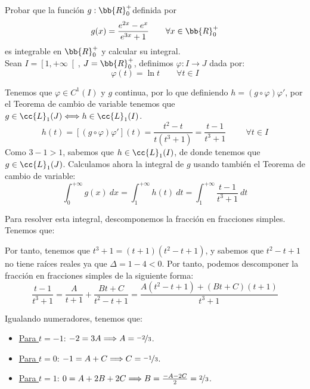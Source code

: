 \begin{ejercicio} Probar que la función $g:\bb{R}_0^+$definida por
    \begin{equation*}
        g(x) = \frac{e^{2x}-e^x}{e^{3x}+1}
        \qquad \forall x\in \bb{R}_0^+
    \end{equation*}
    es integrable en $\bb{R}_0^+$ y calcular su integral.\\

    Sean $I=\left[1,+\infty\right[$, $J=\bb{R}^+_0$, definimos $\varphi:I\longrightarrow J$ dada por:
    \begin{equation*}
        \varphi(t) = \ln t \qquad \forall t\in I
    \end{equation*}
    
    Tenemos que $\varphi \in C^1(I)$ y $g$ continua, por lo que definiendo $h=(g\circ \varphi)\varphi'$, por el Teorema de cambio de variable tenemos que $g\in \cc{L}_1(J)\Longleftrightarrow h\in \cc{L}_1(I)$.
    \begin{equation*}
        h(t) = [(g\circ \varphi)\varphi'](t) = \dfrac{t^2-t}{t(t^3+1)} = \dfrac{t-1}{t^3 + 1} \hspace{1cm} \forall t\in I
    \end{equation*}
    Como $3-1>1$, sabemos que $h\in \cc{L}_1(I)$, de donde tenemos que $g\in \cc{L}_1(J)$. Calculamos ahora la integral de $g$ usando también el Teorema de cambio de variable:
    \begin{equation*}
        \int_0^{+\infty} g(x)~dx = \int_1^{+\infty} h(t)~dt = \int_1^{+\infty} \dfrac{t-1}{t^3+1}~dt
    \end{equation*}

    Para resolver esta integral, descomponemos la fracción en fracciones simples. Tenemos que:
    \begin{figure}[H]
        \centering
    \end{figure}

    Por tanto, tenemos que $t^3+1 = (t+1)(t^2-t+1)$, y sabemos que $t^2-t+1$ no tiene raíces reales ya que $\Delta = 1-4<0$.
    Por tanto, podemos descomponer la fracción en fracciones simples de la siguiente forma:
    \begin{equation*}
        \dfrac{t-1}{t^3+1} = \dfrac{A}{t+1} + \dfrac{Bt+C}{t^2-t+1} = \dfrac{A(t^2-t+1) + (Bt+C)(t+1)}{t^3+1}
    \end{equation*}

    Igualando numeradores, tenemos que:
    \begin{itemize}
        \item \ul{Para $t=-1$}: $-2 = 3A \Longrightarrow A=\nicefrac{-2}{3}$.
        \item \ul{Para $t=0$}: $-1 = A + C \Longrightarrow C=\nicefrac{-1}{3}$.
        \item \ul{Para $t=1$}: $0 = A + 2B + 2C \Longrightarrow B=\frac{-A-2C}{2}=\nicefrac{2}{3}$.
    \end{itemize}


\end{ejercicio}
